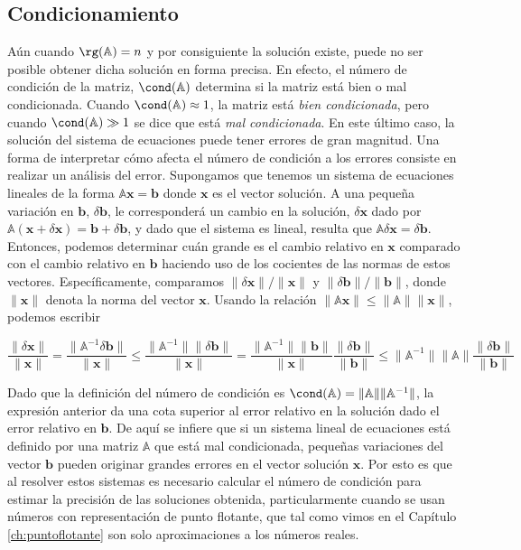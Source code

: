 \subsection{Condicionamiento}\label{sec:condic}

Aún cuando $\rg(\mathbb{A}) = n$ y por consiguiente la solución existe, puede no ser posible obtener dicha solución en forma precisa. En efecto, el número de condición de la matriz, $\cond(\mathbb{A})$ determina si la matriz está bien o mal condicionada. Cuando $\cond(\mathbb{A}) \approx 1$, la matriz está \textit{bien condicionada}, pero cuando $\cond(\mathbb{A}) \gg 1$ se dice que está \textit{mal condicionada}. En este último caso, la solución del sistema de ecuaciones puede tener errores de gran magnitud. Una forma de interpretar cómo afecta el número de condición a los errores consiste en realizar un análisis del error. Supongamos que tenemos un sistema de ecuaciones lineales de la forma $\mathbb{A} \bm{x} = \bm{b}$ donde $\bm{x}$ es el vector solución. A una pequeña variación en $\bm{b}$, $\delta \bm{b}$, le corresponderá un cambio en la solución, $\delta \bm{x}$ dado por $\mathbb{A} (\bm{x} + \delta \bm{x}) = \bm{b} + \delta \bm{b}$, y dado que el sistema es lineal, resulta que $\mathbb{A} \delta \bm{x} = \delta \bm{b}$. Entonces, podemos determinar cuán grande es el cambio relativo en $\bm{x}$ comparado con el cambio relativo en $\bm{b}$ haciendo uso de los cocientes de las normas de estos vectores. Específicamente, comparamos $\lVert \delta \bm{x} \rVert / \lVert \bm{x} \rVert$ y $\lVert \delta \bm{b} \rVert / \lVert \bm{b} \rVert$, donde $\lVert \bm{x} \rVert$ denota la norma del vector $\bm{x}$. Usando la relación $\lVert \mathbb{A} \bm{x} \rVert \leq \lVert \mathbb{A} \rVert \lVert \bm{x} \rVert$, podemos escribir

\[ \frac{\lVert \delta \bm{x} \rVert}{\lVert \bm{x} \rVert} = \frac{\lVert \mathbb{A}^{-1} \delta \bm{b} \rVert}{\lVert \bm{x} \rVert} \leq \frac{\lVert \mathbb{A}^{-1} \rVert \lVert \delta \bm{b} \rVert}{\lVert \bm{x} \rVert} = \frac{\lVert \mathbb{A}^{-1} \rVert \lVert \bm{b} \rVert}{\lVert  \bm{x} \rVert} \frac{\lVert \delta \bm{b} \rVert}{\lVert \bm{b}\rVert} \leq \lVert \mathbb{A}^{-1} \rVert \lVert \mathbb{A} \rVert \frac{\lVert \delta \bm{b} \rVert}{\lVert \bm{b}\rVert} \]

Dado que la definición del número de condición es $\cond(\mathbb{A}) = \lVert \mathbb{A} \rVert \lVert \mathbb{A}^{-1} \rVert$, la expresión anterior da una cota superior al error relativo en la solución dado el error relativo en $\bm{b}$. De aquí se infiere que si un sistema lineal de ecuaciones está definido por una matriz $\mathbb{A}$ que está mal condicionada, pequeñas variaciones del vector $\bm{b}$ pueden originar grandes errores en el vector solución $\bm{x}$. Por esto es que al resolver estos sistemas es necesario calcular el número de condición para estimar la precisión de las soluciones obtenida, particularmente cuando se usan números con representación de punto flotante, que tal como vimos en el Capítulo \ref{ch:puntoflotante} son solo aproximaciones a los números reales.

